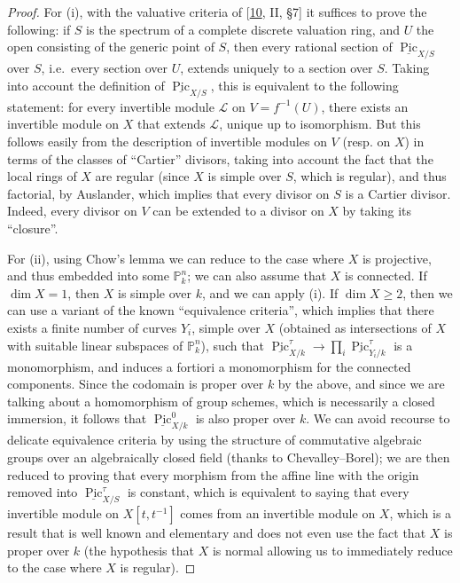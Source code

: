 \documentclass{article}
\newcommand{\oldpage}[1]{\marginpar{\footnotesize$\Big\vert$ \textit{p.~#1}}}
\theoremstyle{definition}
\theoremstyle{definition}
\theoremstyle{definition}
\theoremstyle{definition}
\theoremstyle{remark}
\begin{document}
\begin{proof}
For (i), with the valuative criteria of {[}\protect\hyperlink{ref-GD1960}{10}, II, §7{]} it suffices to prove the following: if \(S\) is the spectrum of a complete discrete valuation ring, and \(U\) the open consisting of the generic point of \(S\), then every rational section of \(\underline{\operatorname{Pic}}_{X/S}\) over \(S\), i.e.~every section over \(U\), extends uniquely to a section over \(S\).
Taking into account the definition of \(\underline{\operatorname{Pic}}_{X/S}\), this is equivalent to the following statement: for every invertible module \({\mathscr{L}}\) on \(V=f^{-1}(U)\), there exists an invertible module on \(X\) that extends \({\mathscr{L}}\), unique up to isomorphism.
But this follows easily from the description of invertible modules on \(V\) (resp. on \(X\)) in terms of the classes of ``Cartier'' divisors, taking into account the fact that the local rings of \(X\) are regular (since \(X\) is simple over \(S\), which is regular), and thus factorial, by Auslander, which implies that every divisor on \(S\) is a Cartier divisor.
Indeed, every divisor on \(V\) can be extended to a divisor on \(X\) by taking its ``closure''.

\oldpage{236-12}For (ii), using Chow's lemma we can reduce to the case where \(X\) is projective, and thus embedded into some \(\mathbb{P}_k^n\);
we can also assume that \(X\) is connected.
If \(\dim X=1\), then \(X\) is simple over \(k\), and we can apply (i).
If \(\dim X\geqslant 2\), then we can use a variant of the known ``equivalence criteria'', which implies that there exists a finite number of curves \(Y_i\), simple over \(X\) (obtained as intersections of \(X\) with suitable linear subspaces of \(\mathbb{P}_k^n\)), such that \(\underline{\operatorname{Pic}}_{X/k}^\tau\to\prod_i\underline{\operatorname{Pic}}_{Y_i/k}^\tau\) is a monomorphism, and induces a fortiori a monomorphism for the connected components.
Since the codomain is proper over \(k\) by the above, and since we are talking about a homomorphism of group schemes, which is necessarily a closed immersion, it follows that \(\underline{\operatorname{Pic}}_{X/k}^0\) is also proper over \(k\).
We can avoid recourse to delicate equivalence criteria by using the structure of commutative algebraic groups over an algebraically closed field (thanks to Chevalley--Borel);
we are then reduced to proving that every morphism from the affine line with the origin removed into \(\underline{\operatorname{Pic}}_{X/S}^\tau\) is constant, which is equivalent to saying that every invertible module on \(X[t,t^{-1}]\) comes from an invertible module on \(X\), which is a result that is well known and elementary and does not even use the fact that \(X\) is proper over \(k\) (the hypothesis that \(X\) is normal allowing us to immediately reduce to the case where \(X\) is regular).
\end{proof}
\end{document}
